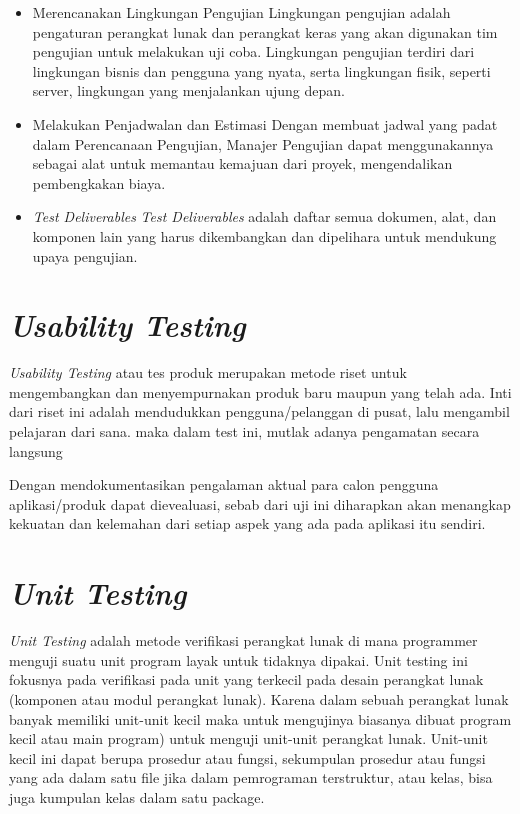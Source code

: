\begin{itemize}
	\item Merencanakan Lingkungan Pengujian
	\newline Lingkungan pengujian adalah pengaturan perangkat lunak dan perangkat keras yang akan digunakan tim pengujian untuk melakukan uji coba. Lingkungan pengujian terdiri dari lingkungan bisnis dan pengguna yang nyata, serta lingkungan fisik, seperti server, lingkungan yang menjalankan ujung depan.
	
	\item {Melakukan Penjadwalan dan Estimasi}
	 \newline Dengan membuat jadwal yang padat dalam Perencanaan Pengujian, Manajer Pengujian dapat menggunakannya sebagai alat untuk memantau kemajuan dari proyek, mengendalikan pembengkakan biaya.
	 
	 \item {\textit{Test Deliverables}}
	 \newline \textit{Test Deliverables} adalah daftar semua dokumen, alat, dan komponen lain yang harus dikembangkan dan dipelihara untuk mendukung upaya pengujian.
	
\end{itemize}

\section {\textit{Usability Testing}}
\par \textit{Usability Testing} atau tes produk merupakan metode riset untuk mengembangkan dan menyempurnakan produk baru maupun yang telah ada. Inti dari riset ini adalah mendudukkan pengguna/pelanggan di pusat, lalu mengambil pelajaran dari sana. maka dalam test ini, mutlak adanya pengamatan secara langsung \citep{nielsen2012}
\par Dengan mendokumentasikan pengalaman aktual para calon pengguna aplikasi/produk dapat dievealuasi, sebab dari uji ini diharapkan akan menangkap kekuatan dan kelemahan dari setiap aspek yang ada pada aplikasi itu sendiri.

\section {\textit{Unit Testing}}
\textit{Unit Testing} adalah metode verifikasi perangkat lunak di mana programmer menguji suatu unit program layak untuk tidaknya dipakai. Unit testing ini fokusnya pada verifikasi pada unit yang terkecil pada desain perangkat lunak (komponen atau modul perangkat lunak). Karena dalam sebuah perangkat lunak banyak memiliki unit-unit kecil maka untuk mengujinya biasanya dibuat program kecil atau main program) untuk menguji unit-unit perangkat lunak. Unit-unit kecil ini dapat berupa prosedur atau fungsi, sekumpulan prosedur atau fungsi yang ada dalam satu file jika dalam pemrograman terstruktur, atau kelas, bisa juga kumpulan kelas dalam satu package. \citep{feridi}

